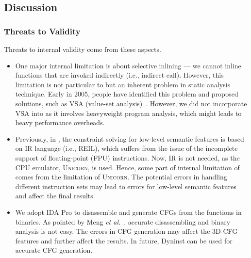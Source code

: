 \vspace{2mm}
\noindent{}


\subsection{Discussion}
\subsubsection{Threats to Validity}
Threats to internal validity come from these aspects.
\begin{itemize}[itemsep=0.15mm]
 \item One major internal limitation  is about selective inlining --- we cannot inline functions that are invoked indirectly (i.e., indirect call). However, this limitation is not particular to \toolNew but an inherent problem in static analysis technique.  Early in 2005, people have identified this problem and proposed solutions, such as VSA (value-set analysis)~\cite{balakrishnan2005wysinwyx}. However, we did not incorporate VSA into \toolNew as it involves heavyweight program analysis, which might leads to heavy performance overheads.
 \item Previously, in \tool, the constraint solving for low-level semantic features is based on IR language (i.e., REIL), which suffers from the issue of the incomplete support of floating-point (FPU) instructions. Now, IR is not needed, as the CPU emulator, \textsc{Unicorn}, is used. Hence, some part of internal limitation of \toolNew comes from the limitation of \textsc{Unicorn}. The potential errors in handling different instruction sets may lead to errors for low-level semantic features and affect the final results.
 \item We adopt IDA Pro to disassemble and generate CFGs from the functions in binaries. As pointed by Meng \emph{et al.}~\cite{DBLP:conf/issta/MengM16}, accurate disassembling and binary analysis is not easy. The errors in CFG generation may affect the 3D-CFG features and further affect the results. In future, Dyninst can be used for accurate CFG generation.
 \end{itemize}

